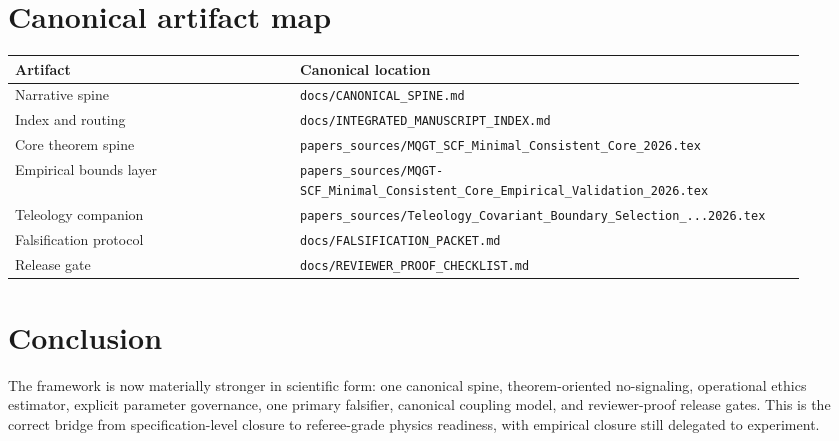 \documentclass[11pt]{article}
\begin{document}
\section{Canonical artifact map}
\begin{center}
\begin{tabular}{@{}p{0.34\linewidth}p{0.58\linewidth}@{}}
\toprule
Artifact & Canonical location \\
\midrule
Narrative spine & \texttt{docs/CANONICAL\_SPINE.md} \\
Index and routing & \texttt{docs/INTEGRATED\_MANUSCRIPT\_INDEX.md} \\
Core theorem spine & \texttt{papers\_sources/MQGT\_SCF\_Minimal\_Consistent\_Core\_2026.tex} \\
Empirical bounds layer & \texttt{papers\_sources/MQGT-SCF\_Minimal\_Consistent\_Core\_Empirical\_Validation\_2026.tex} \\
Teleology companion & \texttt{papers\_sources/Teleology\_Covariant\_Boundary\_Selection\_...2026.tex} \\
Falsification protocol & \texttt{docs/FALSIFICATION\_PACKET.md} \\
Release gate & \texttt{docs/REVIEWER\_PROOF\_CHECKLIST.md} \\
\bottomrule
\end{tabular}
\end{center}

\section{Conclusion}
The framework is now materially stronger in scientific form: one canonical spine, theorem-oriented no-signaling,
operational ethics estimator, explicit parameter governance, one primary falsifier, canonical coupling model,
and reviewer-proof release gates. This is the correct bridge from specification-level closure to referee-grade
physics readiness, with empirical closure still delegated to experiment.
\end{document}
